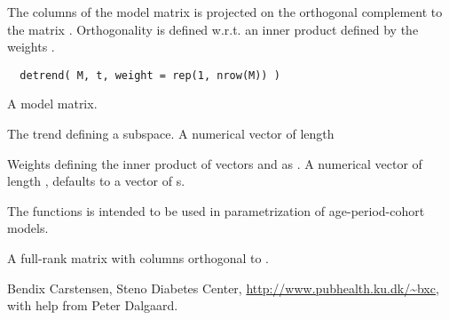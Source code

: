 \begin{Description}\relax
The columns of the model matrix  is projected on the
orthogonal complement to the matrix . Orthogonality 
is defined w.r.t. an inner product defined by the weights .
\end{Description}
\begin{Usage}
\begin{verbatim}
  detrend( M, t, weight = rep(1, nrow(M)) )
\end{verbatim}
\end{Usage}
\begin{Arguments}
\begin{ldescription}
\item[\code{M}] A model matrix. 
\item[\code{t}] The trend defining a subspace. A numerical vector of length
\item[\code{weight}] Weights defining the inner product of vectors 
and  as .
A numerical vector of length , defaults to a vector of
s.
\end{ldescription}
\end{Arguments}
\begin{Details}\relax
The functions is intended to be used in parametrization of
age-period-cohort models.
\end{Details}
\begin{Value}
A full-rank matrix with columns orthogonal to .
\end{Value}
\begin{Author}\relax
Bendix Carstensen, Steno Diabetes Center,
\url{http://www.pubhealth.ku.dk/~bxc}, with help from Peter Dalgaard.
\end{Author}
\begin{SeeAlso}\relax
{}
\end{SeeAlso}

